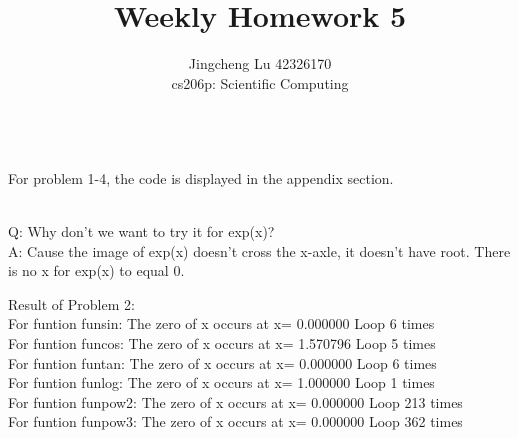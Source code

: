 \documentclass[12pt]{article}
\newenvironment{problem}[2][Problem]{\begin{trivlist}
\item[\hskip \labelsep {\bfseries #1}\hskip \labelsep {\bfseries #2.}]}{\end{trivlist}}
\begin{document}
 
\title{Weekly Homework 5}
\author{Jingcheng Lu 42326170\\ 
cs206p: Scientific Computing}
 
\maketitle
 
\begin{problem}{1}
\text{ }\\
For problem 1-4, the code is displayed in the appendix section.
\end{problem}
\begin{problem}{2}
\text{ }\\
Q: Why don’t we want to try it for exp(x)?\\
A: Cause the image of exp(x) doesn't cross the x-axle, it doesn't have root. There is no x for exp(x) to equal 0.\\
\item Result of Problem 2:\\
For funtion funsin:	 The zero of x occurs at x= 0.000000 	Loop 6 times\\
For funtion funcos:	 The zero of x occurs at x= 1.570796 	Loop 5 times\\
For funtion funtan:	 The zero of x occurs at x= 0.000000 	Loop 6 times\\
For funtion funlog:	 The zero of x occurs at x= 1.000000 	Loop 1 times\\
For funtion funpow2:	 The zero of x occurs at x= 0.000000 	Loop 213 times\\
For funtion funpow3:	 The zero of x occurs at x= 0.000000 	Loop 362 times\\
\end{problem}
\end{document}
